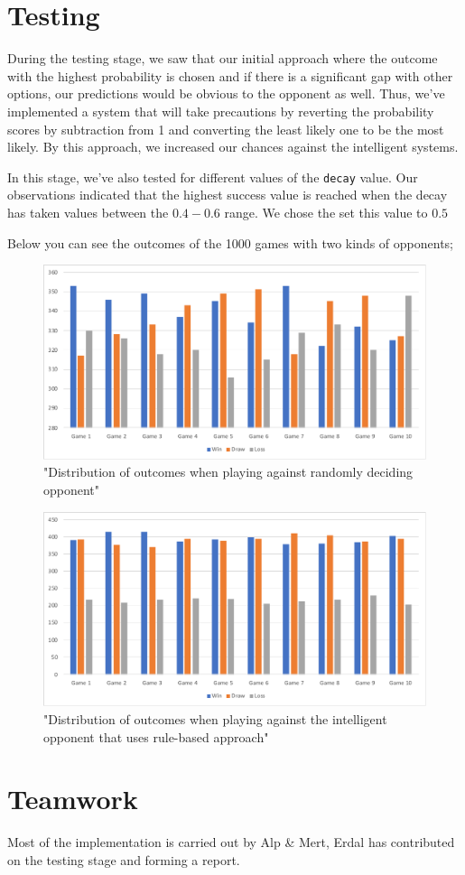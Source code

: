 \documentclass{IEEEtran}
\begin{document}
	
	\section{Testing}
		During the testing stage, we saw that our initial approach where the outcome with the highest probability is chosen and if there is a significant gap with other options, our predictions would be obvious to the opponent as well. Thus, we've implemented a system that will take precautions by reverting the probability scores by subtraction from 1 and converting the least likely one to be the most likely. By this approach, we increased our chances against the intelligent systems.
		
		In this stage, we've also tested for different values of the \texttt{decay} value. Our observations indicated that the highest success value is reached when the decay has taken values between the $0.4-0.6$ range. We chose the set this value to $0.5$
		
		Below you can see the outcomes of the 1000 games with two kinds of opponents;
		
			\begin{figure}[h!]
				\centering
				\includegraphics[scale=0.4]{fully-random.pdf}
				\caption{"Distribution of outcomes when playing against randomly deciding opponent"}\label{fand}
			\end{figure}


			\begin{figure}[h!]
				\centering
				\includegraphics[scale=0.4]{rule-based.pdf}
				\caption{"Distribution of outcomes when playing against the intelligent opponent that uses rule-based approach"}\label{fand}
			\end{figure}


		

	\section{Teamwork}
	
	Most of the implementation is carried out by Alp \& Mert, Erdal has contributed on the testing stage and forming a report. 

	
	
	
\end{document}
